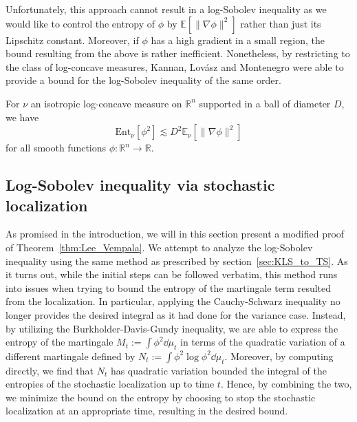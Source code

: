 Unfortunately, this approach cannot result in a log-Sobolev inequality as we would like to control 
the entropy of \(\phi\) by \(\mathbb{E}[\|\nabla \phi\|^2]\) rather than just its Lipschitz constant.
Moreover, if \(\phi\) has a high gradient in a small region, the bound resulting from the above 
is rather inefficient. Nonetheless, by restricting to the class of log-concave measures, Kannan, Lovász and Montenegro 
\cite{Lovasz_2007} were able to provide a bound for the log-Sobolev inequality of the same order.

\begin{lemma}\label{lem:entropy_supp}
  For \(\nu\) an isotropic log-concave measure on \(\mathbb{R}^n\) supported in a ball of diameter \(D\), 
  we have
  \[\text{Ent}_\nu[\phi^2] \lesssim D^2 \mathbb{E}_\nu[\|\nabla \phi\|^2]\]
  for all smooth functions \(\phi : \mathbb{R}^n \to \mathbb{R}\).
\end{lemma}

\subsection{Log-Sobolev inequality via stochastic localization}

As promised in the introduction, we will in this section present a modified proof of Theorem~\ref{thm:Lee_Vempala}.
We attempt to analyze the log-Sobolev inequality using the same method as prescribed by section~\ref{sec:KLS_to_TS}. 
As it turns out, while the initial steps can be followed verbatim, this method runs into issues when trying to 
bound the entropy of the martingale term resulted from the localization. In particular, applying the Cauchy-Schwarz 
inequality no longer provides the desired integral as it had done for the variance case. Instead, by 
utilizing the Burkholder-Davis-Gundy inequality, we are able to express the entropy of the martingale 
\(M_t := \int \phi^2 \dd \mu_t\) in terms of the quadratic 
variation of a different martingale defined by \(N_t := \int \phi^2 \log \phi^2 \dd \mu_t\). Moreover, 
by computing directly, we find that \(N_t\) has quadratic variation bounded the integral of the entropies of the 
stochastic localization up to time \(t\). Hence, by combining the two, we minimize the bound on the entropy by choosing to 
stop the stochastic localization at an appropriate time, resulting in the desired bound.

